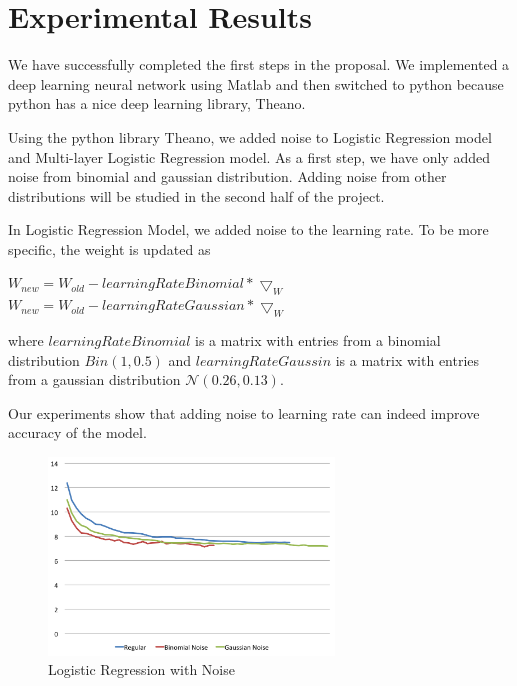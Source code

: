 \section{Experimental Results}
\label{sec:result}

We have successfully completed the first steps in the proposal.
We implemented a deep learning neural network using Matlab and then
switched to python because python has a nice deep learning library,
Theano.

Using the python library Theano, we added noise to Logistic Regression
model and Multi-layer Logistic Regression model.
As a first step, we have only added noise from binomial and gaussian
distribution. Adding noise from other distributions will be studied in
the second half of the project.

In Logistic Regression Model, we added noise to the learning rate.
To be more specific, the weight is updated as

\begin{center}
$W_{new} = W_{old} - learningRateBinomial * \bigtriangledown_{W}$
$W_{new} = W_{old} - learningRateGaussian * \bigtriangledown_{W}$
\end{center}

where $learningRateBinomial$ is a matrix with entries from a binomial
distribution $Bin(1,0.5)$ and $learningRateGaussin$ is a matrix with entries
from a gaussian distribution $\mathcal{N}(0.26,0.13)$.

Our experiments show that adding noise to learning rate can indeed
improve accuracy of the model.

\begin{figure}[h]
\centering
\includegraphics[width=215pt]{figs/logistic_sgd_all.png}
\caption{Logistic Regression with Noise}
\label{fig:logistic-sgd}
\end{figure}

